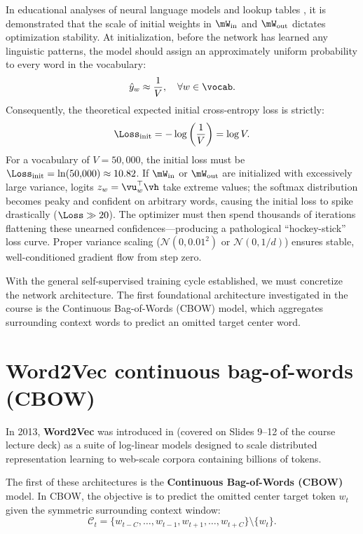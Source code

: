 \documentclass[../../main.tex]{subfiles}
\begin{document}
In educational analyses of neural language models and lookup tables \cite{karpathy2022makemore}, it is demonstrated that the scale of initial weights in $\mW_{\text{in}}$ and $\mW_{\text{out}}$ dictates optimization stability. At initialization, before the network has learned any linguistic patterns, the model should assign an approximately uniform probability to every word in the vocabulary:
\begin{equation}
\label{eq:uniform_prior}
\hat{y}_w \approx \frac{1}{V}, \quad \forall w \in \vocab.
\end{equation}
Consequently, the theoretical expected initial cross-entropy loss is strictly:
\begin{equation}
\label{eq:expected_initial_loss}
\Loss_{\text{init}} = -\log \left( \frac{1}{V} \right) = \log V.
\end{equation}
For a vocabulary of $V = 50{,}000$, the initial loss must be $\Loss_{\text{init}} = \ln(50{,}000) \approx 10.82$. If $\mW_{\text{in}}$ or $\mW_{\text{out}}$ are initialized with excessively large variance, logits $z_w = \vu_w^\top \vh$ take extreme values; the softmax distribution becomes peaky and confident on arbitrary words, causing the initial loss to spike drastically ($\Loss \gg 20$). The optimizer must then spend thousands of iterations flattening these unearned confidences---producing a pathological ``hockey-stick'' loss curve. Proper variance scaling ($\mathcal{N}(0, 0.01^2)$ or $\mathcal{N}(0, 1/d)$) ensures stable, well-conditioned gradient flow from step zero.

With the general self-supervised training cycle established, we must concretize the network architecture. The first foundational architecture investigated in the course is the Continuous Bag-of-Words (CBOW) model, which aggregates surrounding context words to predict an omitted target center word.

\section{Word2Vec continuous bag-of-words (CBOW)}
\label{sec:cbow_architecture}

In 2013, \textbf{Word2Vec} was introduced in \cite{mikolov2013efficient,mikolov2013distributed} (covered on Slides 9--12 of the course lecture deck) as a suite of log-linear models designed to scale distributed representation learning to web-scale corpora containing billions of tokens.

The first of these architectures is the \textbf{Continuous Bag-of-Words (CBOW)} model. In CBOW, the objective is to predict the omitted center target token $w_t$ given the symmetric surrounding context window:
\begin{equation}
\label{eq:cbow_context_def}
\mathcal{C}_t = \{w_{t-C}, \dots, w_{t-1}, w_{t+1}, \dots, w_{t+C}\} \setminus \{w_t\}.
\end{equation}
\end{document}
